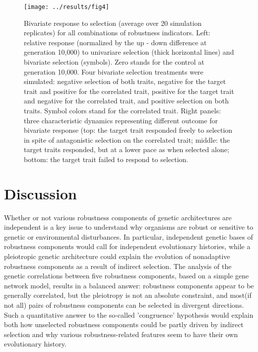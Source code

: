 \documentclass[10pt,a4paper]{article}
\begin{document}
\begin{figure}[t]
\begin{adjustwidth}{-1in}{0in}
\begin{flushright}
\texttt{[image: ../results/fig4]}
\caption{\color{Gray} \label{fig:evolvability} Bivariate response to selection (average over 20 simulation replicates) for all combinations of robustness indicators. Left: relative response (normalized by the up - down difference at generation 10,000) to univariare selection (thick horizontal lines) and bivariate selection (symbols). Zero stands for the control at generation 10,000. Four bivariate selection treatments were simulated: negative selection of both traits, negative for the target trait and positive for the correlated trait, positive for the target trait and negative for the correlated trait, and positive selection on both traits. Symbol colors stand for the correlated trait. Right panels: three characteristic dynamics representing different outcome for bivariate response (top: the target trait responded freely to selection in spite of antagonistic selection on the correlated trait; middle: the target traits responded, but at a lower pace as when selected alone; bottom: the target trait failed to respond to selection. }
\end{flushright}\end{adjustwidth}
\end{figure}


\section{Discussion}

Whether or not various robustness components of genetic architectures are independent is a key issue to understand why organisms are robust or sensitive to genetic or environmental disturbances. In particular, independent genetic bases of robustness components would call for independent evolutionary histories, while a pleiotropic genetic architecture could explain the evolution of nonadaptive robustness components as a result of indirect selection. The analysis of the genetic correlations between five robustness components, based on a simple gene network model, results in a balanced answer: robustness components appear to be generally correlated, but the pleiotropy is not an absolute constraint, and most(if not all) pairs of robustness components can be selected in divergent directions. Such a quantitative answer to the so-called 'congruence' hypothesis \citep{dHW+03} would explain both how unselected robustness components could be partly driven by indirect selection and why various robustness-related features seem to have their own evolutionary history. 
\end{document}
